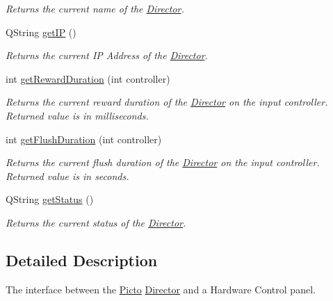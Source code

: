 \begin{DoxyCompactItemize}
\begin{DoxyCompactList}\small\item\em Returns the current name of the \hyperlink{class_director}{Director}. \end{DoxyCompactList}\item 
\hypertarget{class_control_panel_interface_ad7367b7241b245fb72c6423b32ddf960}{Q\-String \hyperlink{class_control_panel_interface_ad7367b7241b245fb72c6423b32ddf960}{get\-I\-P} ()}\label{class_control_panel_interface_ad7367b7241b245fb72c6423b32ddf960}

\begin{DoxyCompactList}\small\item\em Returns the current I\-P Address of the \hyperlink{class_director}{Director}. \end{DoxyCompactList}\item 
int \hyperlink{class_control_panel_interface_a187eb371ccf47922296b8ca335105269}{get\-Reward\-Duration} (int controller)
\begin{DoxyCompactList}\small\item\em Returns the current reward duration of the \hyperlink{class_director}{Director} on the input controller. Returned value is in milliseconds. \end{DoxyCompactList}\item 
int \hyperlink{class_control_panel_interface_ab0a42d8ac19c2f1c2ef2cfd4d4d4e322}{get\-Flush\-Duration} (int controller)
\begin{DoxyCompactList}\small\item\em Returns the current flush duration of the \hyperlink{class_director}{Director} on the input controller. Returned value is in seconds. \end{DoxyCompactList}\item 
\hypertarget{class_control_panel_interface_aa0afb9bd4e7606e35b92f6025dd457e1}{Q\-String \hyperlink{class_control_panel_interface_aa0afb9bd4e7606e35b92f6025dd457e1}{get\-Status} ()}\label{class_control_panel_interface_aa0afb9bd4e7606e35b92f6025dd457e1}

\begin{DoxyCompactList}\small\item\em Returns the current status of the \hyperlink{class_director}{Director}. \end{DoxyCompactList}\end{DoxyCompactItemize}


\subsection{Detailed Description}
The interface between the \hyperlink{namespace_picto}{Picto} \hyperlink{class_director}{Director} and a Hardware Control panel. 

